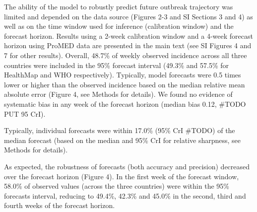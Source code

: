 \documentclass[9pt,twocolumn,twoside,lineno]{pnas-new}
\begin{document}
The ability of the model to robustly predict future outbreak
trajectory was limited and 
depended on the data source (Figures 2-3 and SI Sections 3 and 4)
as well as on the time window used for inference (calibration window)
and the forecast horizon. Results using a 2-week calibration window
and a 4-week forecast horizon using ProMED data are presented in
the main text (see SI Figures 4 and 7 for other results).
Overall, 48.7\% of weekly observed incidence across
all three countries were included in the 95\%
forecast interval (49.3\% and 57.5\% for HealthMap and WHO
respectively). Typically, model forecasts were 0.5 times lower or higher
than the observed incidence based on the median relative mean absolute
error (Figure 4, see Methods for details). We found no evidence of
systematic bias in any week of the forecast horizon (median bias 0.12,
#TODO PUT 95 CrI).




Typically, individual forecasts were within 17.0\% (95\% CrI #TODO)
of the median forecast (based on the median and 95\% CrI for
relative sharpness, see Methods for details).

As expected, the robustness of forecasts (both accuracy and precision)
decreased over the forecast
horizon (Figure 4). In the first week of the forecast window, 58.0\% of
observed values (across the three countries) were within the 95\%
forecasts interval, reducing to 49.4\%, 42.3\% and 45.0\% in the
second, third and fourth weeks of the forecast horizon. 


\end{document}
